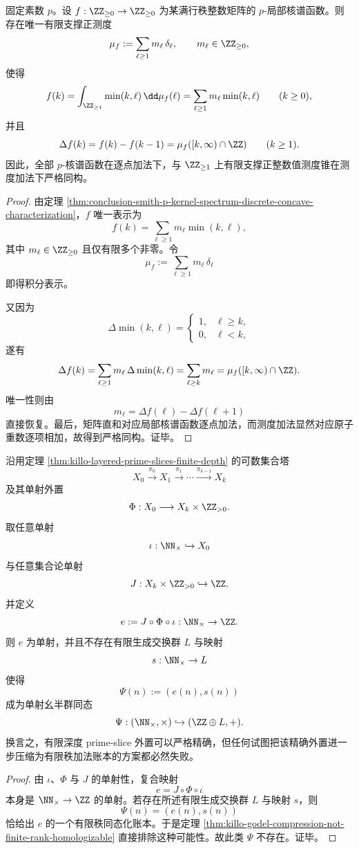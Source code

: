 \begin{theorem}\label{thm:conclusion-smith-p-kernel-spectrum-measure-cone-isomorphism}
固定素数 \(p\)。设 \(f:\ZZ_{\ge 0}\to \ZZ_{\ge 0}\) 为某满行秩整数矩阵的 \(p\)-局部核谱函数。则存在唯一有限支撑正测度
\[
\mu_f:=\sum_{\ell\ge 1}m_\ell\,\delta_\ell,
\qquad
m_\ell\in \ZZ_{\ge 0},
\]
使得
\[
f(k)=\int_{\ZZ_{\ge 1}}\min(k,\ell)\,\dd\mu_f(\ell)
=
\sum_{\ell\ge 1}m_\ell\min(k,\ell)
\qquad(k\ge 0),
\]
并且
\[
\Delta f(k)=f(k)-f(k-1)=\mu_f([k,\infty)\cap \ZZ)
\qquad(k\ge 1).
\]
因此，全部 \(p\)-核谱函数在逐点加法下，与 \(\ZZ_{\ge 1}\) 上有限支撑正整数值测度锥在测度加法下严格同构。
\end{theorem}
\begin{proof}
由定理 \ref{thm:conclusion-smith-p-kernel-spectrum-discrete-concave-characterization}，\(f\) 唯一表示为
\[
f(k)=\sum_{\ell\ge 1}m_\ell\min(k,\ell),
\]
其中 \(m_\ell\in\ZZ_{\ge0}\) 且仅有限多个非零。令
\[
\mu_f:=\sum_{\ell\ge 1}m_\ell\,\delta_\ell
\]
即得积分表示。

又因为
\[
\Delta\min(k,\ell)=
\begin{cases}
1,& \ell\ge k,\\
0,& \ell<k,
\end{cases}
\]
遂有
\[
\Delta f(k)
=
\sum_{\ell\ge 1}m_\ell\,\Delta\min(k,\ell)
=
\sum_{\ell\ge k}m_\ell
=
\mu_f([k,\infty)\cap \ZZ).
\]
唯一性则由
\[
m_\ell=\Delta f(\ell)-\Delta f(\ell+1)
\]
直接恢复。最后，矩阵直和对应局部核谱函数逐点加法，而测度加法显然对应原子重数逐项相加，故得到严格同构。证毕。
\end{proof}

\begin{theorem}\label{thm:conclusion-primeslice-finite-depth-ledger-incompatibility}
沿用定理 \ref{thm:killo-layered-prime-slices-finite-depth} 的可数集合塔
\[
X_0\xrightarrow{\pi_0}X_1\xrightarrow{\pi_1}\cdots\xrightarrow{\pi_{k-1}}X_k
\]
及其单射外置
\[
\Phi:X_0\longrightarrow X_k\times \ZZ_{>0}.
\]
取任意单射
\[
\iota:\NN_{\times}\hookrightarrow X_0
\]
与任意集合论单射
\[
J:X_k\times \ZZ_{>0}\hookrightarrow \ZZ,
\]
并定义
\[
e:=J\circ \Phi\circ \iota:\NN_{\times}\to \ZZ.
\]
则 \(e\) 为单射，并且不存在有限生成交换群 \(L\) 与映射
\[
s:\NN_{\times}\to L
\]
使得
\[
\Psi(n):=(e(n),s(n))
\]
成为单射幺半群同态
\[
\Psi:(\NN_{\times},\times)\hookrightarrow (\ZZ\oplus L,+).
\]
换言之，有限深度 prime-slice 外置可以严格精确，但任何试图把该精确外置进一步压缩为有限秩加法账本的方案都必然失败。
\end{theorem}
\begin{proof}
由 \(\iota\)、\(\Phi\) 与 \(J\) 的单射性，复合映射
\[
e=J\circ \Phi\circ \iota
\]
本身是 \(\NN_{\times}\to\ZZ\) 的单射。若存在所述有限生成交换群 \(L\) 与映射 \(s\)，则
\[
\Psi(n)=(e(n),s(n))
\]
恰给出 \(e\) 的一个有限秩同态化账本。于是定理 \ref{thm:killo-godel-compression-not-finite-rank-homologizable} 直接排除这种可能性。故此类 \(\Psi\) 不存在。证毕。
\end{proof}

